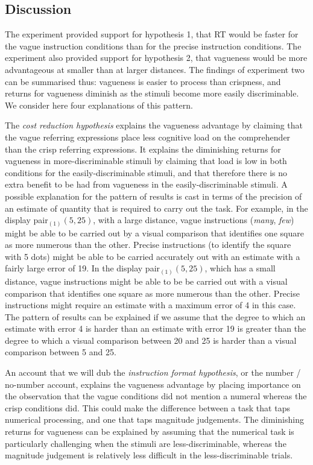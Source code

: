 \documentclass[man,floatmark]{apa}
\begin{document}
\subsection{Discussion}

The experiment provided support for hypothesis 1, that RT would be faster for the vague instruction conditions than for the precise instruction conditions. The experiment also provided support for hypothesis 2, that  vagueness would be more advantageous at smaller than at larger distances.  The findings of experiment two can be summarised thus: vagueness is easier to process than crispness, and returns for vagueness diminish as the stimuli become more easily discriminable. We consider here four explanations of this pattern.

\begin{seriate}
\item The \emph{cost reduction hypothesis} explains the vagueness advantage by claiming that the vague referring expressions place less cognitive load on the comprehender than the crisp referring expressions. It explains the diminishing returns for vagueness in more-discriminable stimuli by claiming that load is low in both conditions for the easily-discriminable stimuli, and that therefore there is no extra benefit to be had from vagueness in the easily-discriminable stimuli. A possible explanation for the pattern of results is cast in terms of the precision of an estimate of quantity that is required to carry out the task. For example, in the display pair$_{(1)}(5, 25)$, with a large distance, vague instructions (\emph{many}, \emph{few}) might be able to  be carried out by a visual comparison that identifies one square as more numerous than the other. Precise instructions (to identify the square with 5 dots) might be able to be carried accurately out with an estimate with a fairly large error of 19. In the display pair$_{(1)}(5, 25)$, which has a small distance, vague instructions might be able to be be carried out with a visual comparison that identifies one square as more numerous than the other. Precise instructions might require an estimate with a maximum error of 4 in this case. The pattern of results can be explained if we assume that the degree to which an estimate with error 4 is harder than an estimate with error 19 is greater than the degree to which a visual comparison between 20 and 25 is harder than a visual comparison between 5 and 25.

\item An account that we will dub the \emph{instruction format hypothesis}, or the number / no-number account, explains the vagueness advantage by placing importance on the observation that the vague conditions did not mention a numeral whereas the crisp conditions did. This could make the difference between a task that taps numerical processing, and one that taps magnitude judgements. The diminishing returns for vagueness can be explained by assuming that the numerical task is particularly challenging when the stimuli are less-discriminable, whereas the magnitude judgement is relatively less difficult in the less-discriminable trials. 


\end{seriate}
\end{document}
